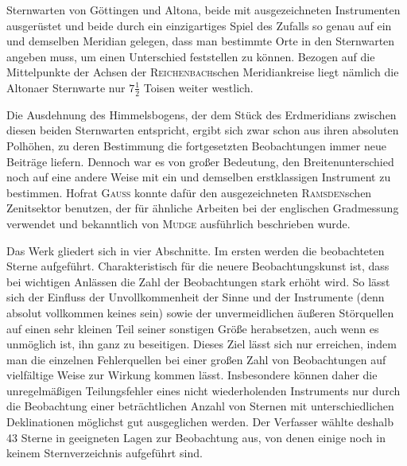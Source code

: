 \par\clearpage
\noindent{}\makebox[12mm][r]{}\par\medskip

\noindent Sternwarten von Göttingen und Altona, beide mit ausgezeichneten
Instrumenten ausgerüstet und beide durch ein einzigartiges Spiel des Zufalls
so genau auf ein und demselben Meridian gelegen, dass man bestimmte Orte in
den Sternwarten angeben muss, um einen Unterschied feststellen zu können.
Bezogen auf die Mittelpunkte der Achsen der \textsc{Reichenbach}schen Meridiankreise
liegt nämlich die Altonaer Sternwarte nur \(7\tfrac12\) Toisen weiter westlich.

Die Ausdehnung des Himmelsbogens, der dem Stück des Erdmeridians zwischen diesen
beiden Sternwarten entspricht, ergibt sich zwar schon aus ihren absoluten
Polhöhen, zu deren Bestimmung die fortgesetzten Beobachtungen immer neue Beiträge
liefern. Dennoch war es von großer Bedeutung, den Breitenunterschied noch auf
eine andere Weise mit ein und demselben erstklassigen Instrument zu bestimmen.
Hofrat \textsc{Gauss} konnte dafür den ausgezeichneten \textsc{Ramsden}schen
Zenitsektor benutzen, der für ähnliche Arbeiten bei der englischen Gradmessung
verwendet und bekanntlich von \textsc{Mudge} ausführlich beschrieben wurde.

Das Werk gliedert sich in vier Abschnitte. Im ersten werden die beobachteten
Sterne aufgeführt. Charakteristisch für die neuere Beobachtungskunst ist, dass
bei wichtigen Anlässen die Zahl der Beobachtungen stark erhöht wird. So lässt
sich der Einfluss der Unvollkommenheit der Sinne und der Instrumente (denn
absolut vollkommen  keines sein) sowie der unvermeidlichen
äußeren Störquellen auf einen sehr kleinen Teil seiner sonstigen Größe
herabsetzen, auch wenn es unmöglich ist, ihn ganz zu beseitigen. Dieses Ziel
lässt sich nur erreichen, indem man die einzelnen Fehlerquellen bei einer
großen Zahl von Beobachtungen auf vielfältige Weise zur Wirkung kommen lässt.
Insbesondere können daher die unregelmäßigen Teilungsfehler eines nicht
wiederholenden Instruments nur durch die Beobachtung einer beträchtlichen
Anzahl von Sternen mit unterschiedlichen Deklinationen möglichst gut
ausgeglichen werden. Der Verfasser wählte deshalb 43 Sterne in geeigneten
Lagen zur Beobachtung aus, von denen einige noch in keinem Sternverzeichnis
aufgeführt sind.

